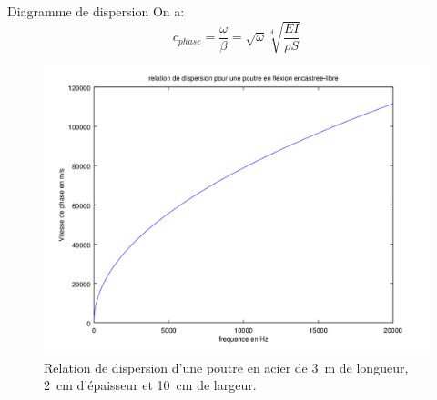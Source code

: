 \documentclass[xcolor=x11names,compress]{beamer}
\renewcommand{\(}{\begin{columns}}
\renewcommand{\)}{\end{columns}}
\newcommand{\<}[1]{\begin{column}{#1}}
\renewcommand{\>}{\end{column}}
\begin{document}
\begin{frame}{Diagramme de dispersion}
On a:
\begin{equation}
 c_{phase} = \frac{\omega}{\beta} = \sqrt{\omega} \sqrt[4]{\frac{EI}{\rho S}}
\end{equation}
\begin{figure}[h!]
\centering \includegraphics[scale = 0.3]{./figures/poutre_dispersion.png}
\caption*{ \scriptsize Relation de dispersion d'une poutre en acier de 3~m de longueur, 2~cm d'épaisseur et 10~cm de largeur.} \label{poutre_graphic2}
\end{figure}
\end{frame}
\end{document}

